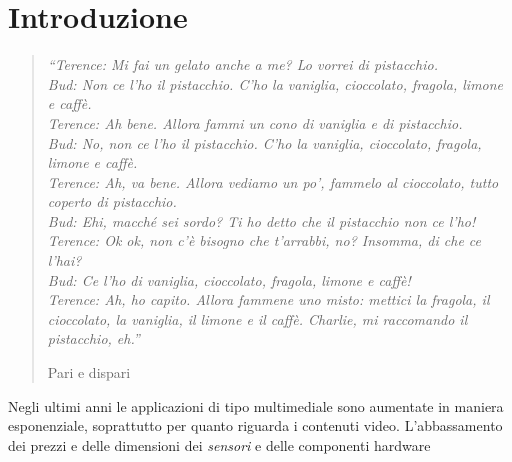\chapter{Introduzione}
\label{Introduzione}
\thispagestyle{empty}

\begin{quotation}
	{\footnotesize
		\noindent\emph{``Terence: Mi fai un gelato anche a me? Lo vorrei di pistacchio. \\
			Bud: Non ce l'ho il pistacchio. C'ho la vaniglia, cioccolato, fragola, limone e caff\`e. \\
			Terence: Ah bene. Allora fammi un cono di vaniglia e di pistacchio. \\
			Bud: No, non ce l'ho il pistacchio. C'ho la vaniglia, cioccolato, fragola, limone e caff\`e. \\
			Terence: Ah, va bene. Allora vediamo un po', fammelo al cioccolato, tutto coperto di pistacchio. \\
			Bud: Ehi, macch\'e sei sordo? Ti ho detto che il pistacchio non ce l'ho! \\
			Terence: Ok ok, non c'\`e bisogno che t'arrabbi, no? Insomma, di che ce l'hai? \\
			Bud: Ce l'ho di vaniglia, cioccolato, fragola, limone e caff\`e! \\
			Terence: Ah, ho capito. Allora fammene uno misto: mettici la fragola, il cioccolato, la vaniglia, il limone e il caff\`e. Charlie, mi raccomando il pistacchio, eh.''}
		\begin{flushright}
			Pari e dispari
		\end{flushright}
	}
\end{quotation}
\vspace{0.5cm}

\noindent Negli ultimi anni le applicazioni di tipo multimediale sono aumentate in maniera esponenziale, soprattutto per quanto riguarda i contenuti video. L'abbassamento dei prezzi e delle dimensioni dei \textit{sensori} e delle componenti hardware
